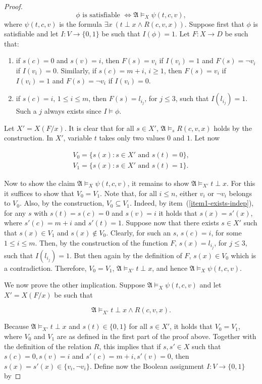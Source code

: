 \documentclass{article}
\theoremstyle{plain}
\theoremstyle{definition}
\newcommand{\mA}{{\mathfrak A}}
\begin{document}
\begin{proof}
\[ \phi \mbox{ is satisfiable } \iff  \mA \models_X \psi(t,c,v),\]
where  $\psi(t,c,v)$ is the formula $\exists x \ (t \perp x \wedge R(c,v,x))$.
Suppose first that $\phi$ is satisfiable and let $I:V\rightarrow \{0,1\}$ be such that $I(\phi)=1$. Let $F:X\rightarrow D$ be such that: 
\begin{enumerate}
\item\label{item1-exists-indep} if $s(c)=0$ and $s(v)=i$,  then $F(s)=v_i$ if $I(v_i)=1$ and $F(s)=\neg v_i$ if $I(v_i)=0$. Similarly, if $s(c)=m+i$, $i\geq 1$, then  $F(s)=v_i$ if $I(v_i)=1$ and $F(s)=\neg v_i$ if $I(v_i)=0$.

\item\label{item2-exists-indep} if $s(c)=i$, $1\leq i\leq m$, then $F(s)=l_{i_j}$, for $j\leq 3$, such that $I(l_{i_j})=1$. Such a $j$ always exists since $I\models \phi$.
\end{enumerate}

Let $X'=X(F/x)$. It is clear that for all $s\in X'$, $\mA \models_s R(c,v,x)$ holds by the construction. In $X'$, variable $t$ takes only two values $0$ and $1$. Let now

\[ 
\begin{array}{l}
V_0=\{s(x): s\in X' \mbox{ and } s(t)=0  \}, \\
 V_1=\{s(x): s\in X' \mbox{ and } s(t)=1  \}.
\end{array}
\]

Now to  show the claim  $\mA \models_X \psi(t,c,v)$, it remains to  show $\mA\models _{X'} t \perp x$. For this it suffices to show that $V_0=V_1$. Note that, for all $i\leq n$, either $v_i$ or $\neg v_i$ belongs to $V_0$. Also, by the construction, $V_0\subseteq V_1$. Indeed, by item~(\ref{item1-exists-indep}), for any $s$ with $s(t)=s(c)=0$ and  $s(v)=i$ it holds that $s(x)=s'(x)$, where $s'(c)=m+i$ and $s'(t)=1$.
Suppose now that there exists $s\in X'$ such that $s(x)\in V_1$ and $s(x)\not\in V_0$. Clearly, for such an $s$,  $s(c)=i$, for some $1\leq i\leq m$. Then, by the construction of the function $F$, $s(x)=l_{i_j}$, for $j\leq 3$, such that $I(l_{i_j})=1$. But then again by the definition of $F$, $s(x)\in V_0$ which is a contradiction. Therefore, $V_0=V_1$, $\mA\models _{X'} t \perp x$, and hence  $\mA \models_X \psi(t,c,v)$.

We now prove the other implication.
Suppose  $\mA\models_X\psi(t,c,v)$ and let $X'=X(F/x)$ be such that

 \[ \mA\models_{X'}  t \perp x \wedge R(c,v,x). \]
 
 Because $\mA\models_{X'} t \perp x$ and $s(t)\in \{0,1\}$ for all $s\in X'$, it holds that $V_0=V_1$, where $V_0$ and $V_1$ are as defined in the first part of the proof above. Together with the definition of the relation $R$, this implies that if $s,s'\in X$ such that $s(c)=0, s(v)=i$ and $s'(c)=m+i, s'(v)=0$, then $s(x)=s'(x)\in \{v_i,\neg v_i\}$. 
 Define now the Boolean assignment $I:V\rightarrow \{0,1\}$ by
 

\end{proof}
\end{document}
